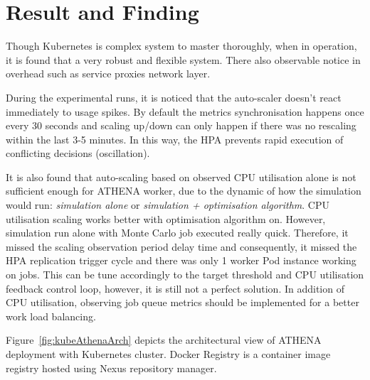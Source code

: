 
\newpage

\section{Result and Finding}

Though Kubernetes is complex system to master thoroughly, when in operation, it is found that a very robust and flexible system. There also observable notice in overhead such as service proxies network layer. 

During the experimental runs, it is noticed that the auto-scaler doesn't react immediately to usage spikes. By default the metrics synchronisation happens once every 30 seconds and scaling up/down can only happen if there was no rescaling within the last 3-5 minutes. In this way, the HPA prevents rapid execution of conflicting decisions (oscillation). 

It is also found that auto-scaling based on observed CPU utilisation alone is not sufficient enough for ATHENA worker, due to the dynamic of how the simulation would run: \emph{simulation alone} or \emph{simulation + optimisation algorithm}. CPU utilisation scaling works better with optimisation algorithm on. However, simulation run alone with Monte Carlo job executed really quick. Therefore, it missed the scaling observation period delay time and consequently, it missed the HPA replication trigger cycle and there was only 1 worker Pod instance working on jobs. This can be tune accordingly to the target threshold and CPU utilisation feedback control loop, however, it is still not a perfect solution. In addition of CPU utilisation, observing job queue metrics should be implemented for a better work load balancing.

Figure~\ref{fig:kubeAthenaArch} depicts the architectural view of ATHENA deployment with Kubernetes cluster. Docker Registry is a container image registry hosted using Nexus repository manager.

